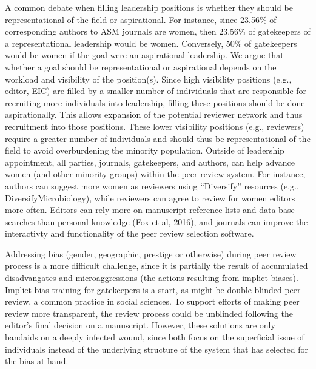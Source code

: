 \documentclass[11pt,]{article}
\begin{document}
A common debate when filling leadership positions is whether they should
be representational of the field or aspirational. For instance, since
23.56\% of corresponding authors to ASM journals are women, then 23.56\%
of gatekeepers of a representational leadership would be women.
Conversely, 50\% of gatekeepers would be women if the goal were an
aspirational leadership. We argue that whether a goal should be
representational or aspirational depends on the workload and visibility
of the position(s). Since high visibility positions (e.g., editor, EIC)
are filled by a smaller number of individuals that are responsible for
recruiting more individuals into leadership, filling these positions
should be done aspirationally. This allows expansion of the potential
reviewer network and thus recruitment into those positions. These lower
visibility positions (e.g., reviewers) require a greater number of
individuals and should thus be representational of the field to avoid
overburdening the minority population. Outside of leadership
appointment, all parties, journals, gatekeepers, and authors, can help
advance women (and other minority groups) within the peer review system.
For instance, authors can suggest more women as reviewers using
``Diversify'' resources (e.g., DiversifyMicrobiology), while reviewers
can agree to review for women editors more often. Editors can rely more
on manuscript reference lists and data base searches than personal
knowledge (Fox et al, 2016), and journals can improve the interactivty
and functionality of the peer review selection software.

Addressing bias (gender, geographic, prestige or otherwise) during peer
review process is a more difficult challenge, since it is partially the
result of accumulated disadvangates and microaggressions (the actions
resulting from implict biases). Implict bias training for gatekeepers is
a start, as might be double-blinded peer review, a common practice in
social sciences. To support efforts of making peer review more
transparent, the review process could be unblinded following the
editor's final decision on a manuscript. However, these solutions are
only bandaids on a deeply infected wound, since both focus on the
superficial issue of individuals instead of the underlying structure of
the system that has selected for the bias at hand.
\end{document}
